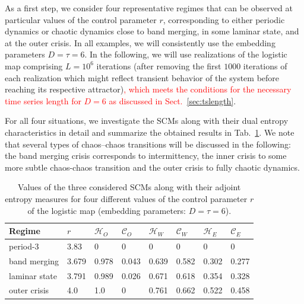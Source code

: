 \documentclass[aip,cha,reprint,nofootinbib]{revtex4-1}
\begin{document}
As a first step, we consider four representative regimes that can be observed at particular values of the control parameter $r$, corresponding to either periodic dynamics or chaotic dynamics close to band merging, in some laminar state, and at the outer crisis. In all examples, we will consistently use the embedding parameters $D = \tau = 6$. 
In the following, we will use realizations of the logistic map comprising $L = 10^6$ iterations (after removing the first $1000$ iterations of each realization which might reflect transient behavior of the system before reaching its respective attractor)\textcolor{red}{, which meets the conditions for the necessary time series length for $D=6$ as discussed in Sect.~\ref{sec:tslength}}. 

For all four situations, we investigate the SCMs along with their dual entropy characteristics in detail and summarize the obtained results in Tab.~\ref{tableLog}. We note that several types of chaos--chaos transitions will be discussed in the following: the band merging crisis corresponds to intermittency, the inner crisis to some more subtle chaos-chaos transition and the outer crisis to fully chaotic dynamics. 
\begin{table}[htb]
    {\begin{tabular}{l  l  l  l  l  l  l  l}
    \hline
    Regime & $r$      & $\mathcal{H}_O$ & $\mathcal{C}_O$ & $\mathcal{H}_W$ & $\mathcal{C}_W$ & $\mathcal{H}_E$   & $\mathcal{C}_E$  \\
    \hline
    period-3      & 3.83 & 0 & 0 & 0 & 0 & 0 & 0 \\
    \hline
    band merging    & 3.679 & 0.978 & 0.043 & 0.639 & 0.582 & 0.302 & 0.277  \\
    \hline
    laminar state    & 3.791 & 0.989 & 0.026 & 0.671 & 0.618 & 0.354 & 0.328 \\
    \hline
    outer crisis  & 4.0 & 1.0 & 0 & 0.761 & 0.662 & 0.522 & 0.458 \\
    \hline
    \end{tabular}}
   \caption{Values of the three considered SCMs along with their adjoint entropy measures for four different values of the control parameter $r$ of the logistic map (embedding parameters: $D = \tau = 6$).   \label{tableLog}}    
\end{table}
\end{document}
